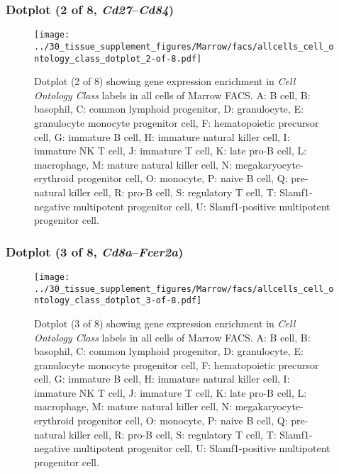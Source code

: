 \subsubsection{Dotplot (2 of 8, \emph{Cd27}--\emph{Cd84})}
\begin{figure}[h]
\centering
\texttt{[image: ../30\_tissue\_supplement\_figures/Marrow/facs/allcells\_cell\_ontology\_class\_dotplot\_2-of-8.pdf]}

\caption{ Dotplot (2 of 8)  showing gene expression enrichment in \emph{Cell Ontology Class} labels in all cells of Marrow FACS. A: B cell, B: basophil, C: common lymphoid progenitor, D: granulocyte, E: granulocyte monocyte progenitor cell, F: hematopoietic precursor cell, G: immature B cell, H: immature natural killer cell, I: immature NK T cell, J: immature T cell, K: late pro-B cell, L: macrophage, M: mature natural killer cell, N: megakaryocyte-erythroid progenitor cell, O: monocyte, P: naive B cell, Q: pre-natural killer cell, R: pro-B cell, S: regulatory T cell, T: Slamf1-negative multipotent progenitor cell, U: Slamf1-positive multipotent progenitor cell.}
\end{figure}


\clearpage

\subsubsection{Dotplot (3 of 8, \emph{Cd8a}--\emph{Fcer2a})}
\begin{figure}[h]
\centering
\texttt{[image: ../30\_tissue\_supplement\_figures/Marrow/facs/allcells\_cell\_ontology\_class\_dotplot\_3-of-8.pdf]}

\caption{ Dotplot (3 of 8)  showing gene expression enrichment in \emph{Cell Ontology Class} labels in all cells of Marrow FACS. A: B cell, B: basophil, C: common lymphoid progenitor, D: granulocyte, E: granulocyte monocyte progenitor cell, F: hematopoietic precursor cell, G: immature B cell, H: immature natural killer cell, I: immature NK T cell, J: immature T cell, K: late pro-B cell, L: macrophage, M: mature natural killer cell, N: megakaryocyte-erythroid progenitor cell, O: monocyte, P: naive B cell, Q: pre-natural killer cell, R: pro-B cell, S: regulatory T cell, T: Slamf1-negative multipotent progenitor cell, U: Slamf1-positive multipotent progenitor cell.}
\end{figure}


\clearpage

